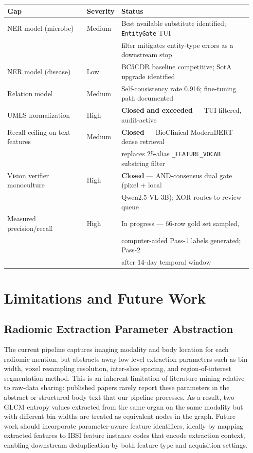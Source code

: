 \documentclass[12pt, letterpaper]{article}
\begin{document}
\begin{center}
\begin{tabular}{lll}
\textbf{Gap} & \textbf{Severity} & \textbf{Status} \\
\hline
NER model (microbe) & Medium & Best available substitute identified; \texttt{EntityGate} TUI \\
& & filter mitigates entity-type errors as a downstream stop \\
NER model (disease) & Low & BC5CDR baseline competitive; SotA upgrade identified \\
Relation model & Medium & Self-consistency rate 0.916; fine-tuning path documented \\
UMLS normalization & High & \textbf{Closed and exceeded} --- TUI-filtered, audit-active \\
Recall ceiling on text features & Medium & \textbf{Closed} --- BioClinical-ModernBERT dense retrieval \\
& & replaces 25-alias \texttt{\_FEATURE\_VOCAB} substring filter \\
Vision verifier monoculture & High & \textbf{Closed} --- AND-consensus dual gate (pixel + local \\
& & Qwen2.5-VL-3B); XOR routes to review queue \\
Measured precision/recall & High & In progress --- 66-row gold set sampled, \\
& & computer-aided Pass-1 labels generated; Pass-2 \\
& & after 14-day temporal window \\
\end{tabular}
\end{center}

\section{Limitations and Future Work}

\subsection{Radiomic Extraction Parameter Abstraction}

The current pipeline captures imaging modality and body location for each radiomic mention, but abstracts away low-level extraction parameters such as bin width, voxel resampling resolution, inter-slice spacing, and region-of-interest segmentation method. This is an inherent limitation of literature-mining relative to raw-data sharing: published papers rarely report these parameters in the abstract or structured body text that our pipeline processes. As a result, two GLCM entropy values extracted from the same organ on the same modality but with different bin widths are treated as equivalent nodes in the graph. Future work should incorporate parameter-aware feature identifiers, ideally by mapping extracted features to IBSI feature instance codes that encode extraction context, enabling downstream deduplication by both feature type and acquisition settings.
\end{document}
